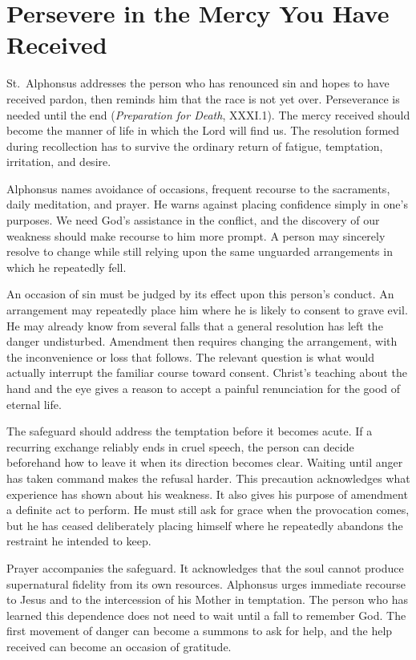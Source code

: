 \section{Persevere in the Mercy You Have Received}

St.~Alphonsus addresses the person who has renounced sin and hopes to have received pardon, then reminds him that the race is not yet over. Perseverance is needed until the end (\emph{Preparation for Death}, XXXI.1). The mercy received should become the manner of life in which the Lord will find us. The resolution formed during recollection has to survive the ordinary return of fatigue, temptation, irritation, and desire.

Alphonsus names avoidance of occasions, frequent recourse to the sacraments, daily meditation, and prayer. He warns against placing confidence simply in one's purposes. We need God's assistance in the conflict, and the discovery of our weakness should make recourse to him more prompt. A person may sincerely resolve to change while still relying upon the same unguarded arrangements in which he repeatedly fell.

An occasion of sin must be judged by its effect upon this person's conduct. An arrangement may repeatedly place him where he is likely to consent to grave evil. He may already know from several falls that a general resolution has left the danger undisturbed. Amendment then requires changing the arrangement, with the inconvenience or loss that follows. The relevant question is what would actually interrupt the familiar course toward consent. Christ's teaching about the hand and the eye gives a reason to accept a painful renunciation for the good of eternal life.

The safeguard should address the temptation before it becomes acute. If a recurring exchange reliably ends in cruel speech, the person can decide beforehand how to leave it when its direction becomes clear. Waiting until anger has taken command makes the refusal harder. This precaution acknowledges what experience has shown about his weakness. It also gives his purpose of amendment a definite act to perform. He must still ask for grace when the provocation comes, but he has ceased deliberately placing himself where he repeatedly abandons the restraint he intended to keep.

Prayer accompanies the safeguard. It acknowledges that the soul cannot produce supernatural fidelity from its own resources. Alphonsus urges immediate recourse to Jesus and to the intercession of his Mother in temptation. The person who has learned this dependence does not need to wait until a fall to remember God. The first movement of danger can become a summons to ask for help, and the help received can become an occasion of gratitude.

